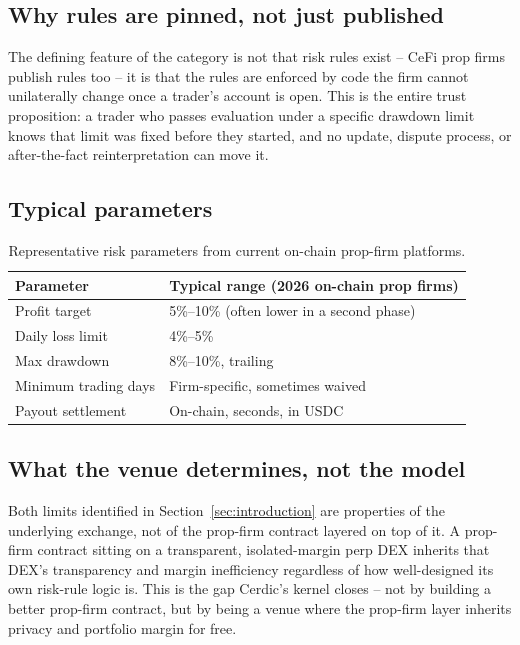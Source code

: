 \documentclass[11pt,a4paper]{article}
\begin{document}
\subsection{Why rules are pinned, not just published}

The defining feature of the category is not that risk rules exist -- CeFi prop firms
publish rules too -- it is that the rules are enforced by code the firm cannot unilaterally
change once a trader's account is open. This is the entire trust proposition: a trader who
passes evaluation under a specific drawdown limit knows that limit was fixed before they
started, and no update, dispute process, or after-the-fact reinterpretation can move it.

\subsection{Typical parameters}

\begin{table}[h]
  \centering
  \begin{tabular}{ll}
    \toprule
    \textbf{Parameter} & \textbf{Typical range (2026 on-chain prop firms)} \\
    \midrule
    Profit target & 5\%--10\% (often lower in a second phase) \\
    Daily loss limit & 4\%--5\% \\
    Max drawdown & 8\%--10\%, trailing \\
    Minimum trading days & Firm-specific, sometimes waived \\
    Payout settlement & On-chain, seconds, in USDC \\
    \bottomrule
  \end{tabular}
  \caption{Representative risk parameters from current on-chain prop-firm platforms.}
  \label{tab:params}
\end{table}

\subsection{What the venue determines, not the model}

Both limits identified in Section~\ref{sec:introduction} are properties of the underlying
exchange, not of the prop-firm contract layered on top of it. A prop-firm contract sitting
on a transparent, isolated-margin perp DEX inherits that DEX's transparency and margin
inefficiency regardless of how well-designed its own risk-rule logic is. This is the gap
Cerdic's kernel closes -- not by building a better prop-firm contract, but by being a
venue where the prop-firm layer inherits privacy and portfolio margin for free.
\end{document}
